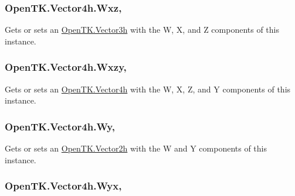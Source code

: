 \hypertarget{struct_open_t_k_1_1_vector4h_a91334e78007962c42553336c28c26815}{
\subsubsection[{Wxz}]{ Open\-T\-K.\-Vector4h.\-Wxz\hspace{0.3cm}{\ttfamily [get]}, {\ttfamily [set]}}}\label{struct_open_t_k_1_1_vector4h_a91334e78007962c42553336c28c26815}


Gets or sets an \hyperlink{struct_open_t_k_1_1_vector3h}{Open\-T\-K.\-Vector3h} with the W, X, and Z components of this instance. 

\hypertarget{struct_open_t_k_1_1_vector4h_a896704c1bef920ea78604f73d46187a8}{
\subsubsection[{Wxzy}]{ Open\-T\-K.\-Vector4h.\-Wxzy\hspace{0.3cm}{\ttfamily [get]}, {\ttfamily [set]}}}\label{struct_open_t_k_1_1_vector4h_a896704c1bef920ea78604f73d46187a8}


Gets or sets an \hyperlink{struct_open_t_k_1_1_vector4h}{Open\-T\-K.\-Vector4h} with the W, X, Z, and Y components of this instance. 

\hypertarget{struct_open_t_k_1_1_vector4h_a750c6f6a4c382dc92f395c2ea1aae72f}{
\subsubsection[{Wy}]{ Open\-T\-K.\-Vector4h.\-Wy\hspace{0.3cm}{\ttfamily [get]}, {\ttfamily [set]}}}\label{struct_open_t_k_1_1_vector4h_a750c6f6a4c382dc92f395c2ea1aae72f}


Gets or sets an \hyperlink{struct_open_t_k_1_1_vector2h}{Open\-T\-K.\-Vector2h} with the W and Y components of this instance. 

\hypertarget{struct_open_t_k_1_1_vector4h_a7ea82f9d012ff182ce3f009263304d2c}{
\subsubsection[{Wyx}]{ Open\-T\-K.\-Vector4h.\-Wyx\hspace{0.3cm}{\ttfamily [get]}, {\ttfamily [set]}}}\label{struct_open_t_k_1_1_vector4h_a7ea82f9d012ff182ce3f009263304d2c}


